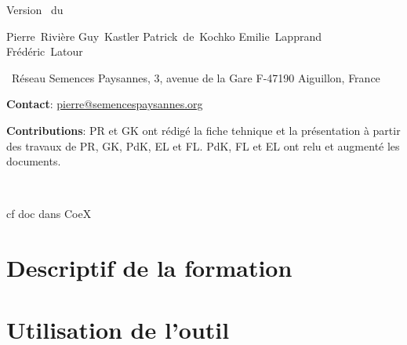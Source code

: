 


\graphicspath{{../../ressources/figures/}}




\pagestyle{empty}

\begin{center}

\headtitlepagefiche{\logoRSP}{\formationFb}

\vfill

\large
Version \versionFFb~du \dateversionFFb

\vfill

\normalsize

Pierre~Rivière \hspace{.5cm}
Guy~Kastler \hspace{.5cm}
Patrick~de~Kochko \hspace{.5cm}
Emilie~Lapprand \hspace{.5cm}
Frédéric~Latour

\end{center}
\small
\noindent{}~Réseau Semences Paysannes, 3, avenue de la Gare F-47190 Aiguillon, France 

\noindent\up{*} \textbf{Contact}: \href{mailto:pierre@semencespaysannes.org}{\textcolor{mln-green} {pierre@semencespaysannes.org}}

\noindent\textbf{Contributions}: PR et GK ont rédigé la fiche tehnique et la présentation à partir des travaux de PR, GK, PdK, EL et FL. PdK, FL et EL ont relu et augmenté les documents.

\normalsize

\vfill


\newpage ~\\ \newpage \tableofcontents \newpage \pagestyle{plain}


cf doc dans CoeX

\section*{Descriptif de la formation}


\section{Utilisation de l'outil \BDD} 

